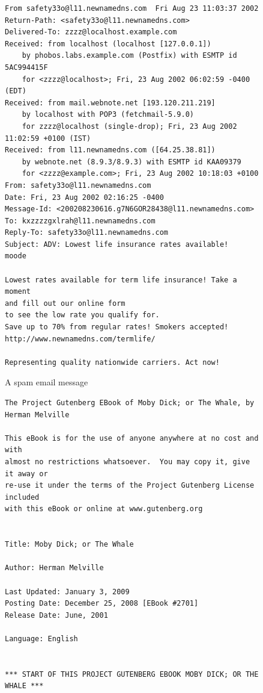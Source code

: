 \documentclass[12pt,oneside]{book}\usepackage[]{graphicx}\usepackage[]{color}
\begin{document}
{\begin{figure}[h]
\begin{Verbatim}[fontsize = \small]
From safety33o@l11.newnamedns.com  Fri Aug 23 11:03:37 2002
Return-Path: <safety33o@l11.newnamedns.com>
Delivered-To: zzzz@localhost.example.com
Received: from localhost (localhost [127.0.0.1])
	by phobos.labs.example.com (Postfix) with ESMTP id 5AC994415F
	for <zzzz@localhost>; Fri, 23 Aug 2002 06:02:59 -0400 (EDT)
Received: from mail.webnote.net [193.120.211.219]
	by localhost with POP3 (fetchmail-5.9.0)
	for zzzz@localhost (single-drop); Fri, 23 Aug 2002 11:02:59 +0100 (IST)
Received: from l11.newnamedns.com ([64.25.38.81])
	by webnote.net (8.9.3/8.9.3) with ESMTP id KAA09379
	for <zzzz@example.com>; Fri, 23 Aug 2002 10:18:03 +0100
From: safety33o@l11.newnamedns.com
Date: Fri, 23 Aug 2002 02:16:25 -0400
Message-Id: <200208230616.g7N6GOR28438@l11.newnamedns.com>
To: kxzzzzgxlrah@l11.newnamedns.com
Reply-To: safety33o@l11.newnamedns.com
Subject: ADV: Lowest life insurance rates available!                                                   
moode

Lowest rates available for term life insurance! Take a moment 
and fill out our online form 
to see the low rate you qualify for. 
Save up to 70% from regular rates! Smokers accepted! 
http://www.newnamedns.com/termlife/ 
          
Representing quality nationwide carriers. Act now!
\end{Verbatim}
\caption{A spam email message}
\label{FIG:SPAMAGAIN}
\end{figure}

\begin{figure}[h]
\begin{Verbatim}[fontsize = \small]
The Project Gutenberg EBook of Moby Dick; or The Whale, by Herman Melville

This eBook is for the use of anyone anywhere at no cost and with
almost no restrictions whatsoever.  You may copy it, give it away or
re-use it under the terms of the Project Gutenberg License included
with this eBook or online at www.gutenberg.org


Title: Moby Dick; or The Whale

Author: Herman Melville

Last Updated: January 3, 2009
Posting Date: December 25, 2008 [EBook #2701]
Release Date: June, 2001

Language: English


*** START OF THIS PROJECT GUTENBERG EBOOK MOBY DICK; OR THE WHALE ***





\end{Verbatim}
\end{figure}}
\end{document}
